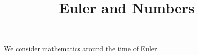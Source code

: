\documentclass{ximera}
\title{Euler and Numbers}
\begin{document}
\begin{abstract}
\end{abstract}
\maketitle

We consider mathematics around the time of Euler.
\end{document}
